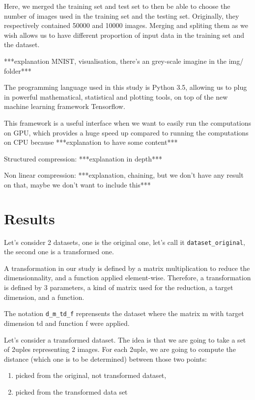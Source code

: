 \documentclass[11pt,a4paper]{article}
\begin{document}
	
	Here, we merged the training set and test set to then be able to choose the number of images used in the training set and the testing set. Originally, they respectively contained 50000 and 10000 images. Merging and spliting them as we wish allows us to have different proportion of input data in the training set and the dataset.
	
	
	***explanation MNIST, visualisation, there's an grey-scale imagine in the img/ folder***
	
	
	The programming language used in this study is Python 3.5, allowing us to plug in powerful mathematical, statistical and plotting tools, on top of the new machine learning framework Tensorflow.
	
	
	This framework is a useful interface when we want to easily run the computations on GPU, which provides a huge speed up compared to running the computations on CPU because ***explanation to have some content***
	
	Structured compression:
	***explanation in depth***
	
	Non linear compression:
	***explanation, chaining, but we don't have any result on that, maybe we don't want to include this***
	
	\section{Results}
	Let's consider 2 datasets, one is the original one, let's call it \texttt{dataset\_original}, the second one is a transformed one.
	
	
	A transformation in our study is defined by a matrix multiplication to reduce the dimensionnality, and a function applied element-wise. Therefore, a transformation is defined by 3 parameters, a kind of matrix used for the reduction, a target dimension, and a function.
	
	
	The notation \texttt{d\_m\_td\_f} reprensents the dataset where the matrix m with target dimension td and function f were applied.
	
	Let's consider a transformed dataset.
	The idea is that we are going to take a set of 2uples representing 2 images. For each 2uple, we are going to compute the distance (which one is to be determined) between those two points:
	
	\begin{enumerate}
		\item picked from the original, not transformed dataset,
		\item picked from the transformed data set
	\end{enumerate}
\end{document}
